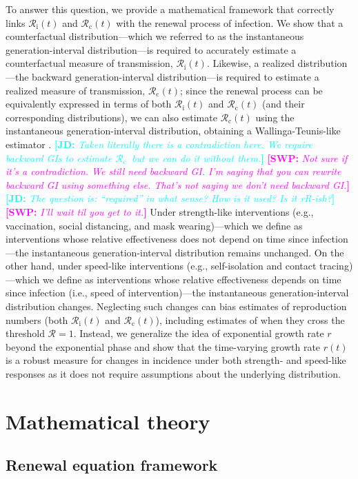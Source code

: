 \documentclass[12pt]{article}
\newcommand{\comment}{\showcomment}
\newcommand{\showcomment}[3]{\textcolor{#1}{\textbf{[#2: }\textsl{#3}\textbf{]}}}
\newcommand{\jd}[1]{\comment{cyan}{JD}{#1}}
\newcommand{\swp}[1]{\comment{magenta}{SWP}{#1}}
\newcommand{\Rx}[1]{\ensuremath{{\mathcal R}_{#1}}\xspace}
\newcommand{\Rc}{\Rx{\mathrm{c}}}
\newcommand{\Ri}{\Rx{\mathrm{i}}}
\newcommand{\RR}{\ensuremath{{\mathcal R}}\xspace}
\begin{document}
To answer this question, we provide a mathematical framework that correctly links $\Ri(t)$ and $\Rc(t)$ with the renewal process of infection.
We show that a counterfactual distribution---which we referred to as the instantaneous generation-interval distribution---is required to accurately estimate a counterfactual measure of transmission, $\Ri(t)$.
Likewise, a realized distribution---the backward generation-interval distribution---is required to estimate a realized measure of transmission, $\Rc(t)$;
since the renewal process can be equivalently expressed in terms of both $\Ri(t)$ and $\Rc(t)$ (and their corresponding distributions), we can also estimate $\Rc(t)$ using the instantaneous generation-interval distribution, obtaining a Wallinga-Teunis-like estimator \citep{wallinga2004different}.
\jd{Taken literally there is a contradiction here. We require backward GIs to estimate \Rc\, but we can do it without them.}
\swp{Not sure if it's a contradiction. We still need backward GI. I'm saying that you can rewrite backward GI using something else. That's not saying we don't need backward GI.}
\jd{The question is: ``required'' in what sense? How is it used? Is it rR-ish?}
\swp{I'll wait til you get to it.}
Under strength-like interventions (e.g., vaccination, social distancing, and mask wearing)---which we define as interventions whose relative effectiveness does not depend on time since infection---the instantaneous generation-interval distribution remains unchanged.
On the other hand, under speed-like interventions (e.g., self-isolation and contact tracing)---which we define as interventions whose relative effectiveness depends on time since infection (i.e., speed of intervention)---the instantaneous generation-interval distribution changes.
Neglecting such changes can bias estimates of reproduction numbers (both $\Ri(t)$ and $\Rc(t)$), including estimates of when they cross the threshold $\RR=1$.
Instead, we generalize the idea of exponential growth rate $r$ beyond the exponential phase and show that the time-varying growth rate $r(t)$ is a robust measure for changes in incidence under both strength- and speed-like responses as it does not require assumptions about the underlying distribution.

\section{Mathematical theory}

\subsection{Renewal equation framework}
\end{document}
